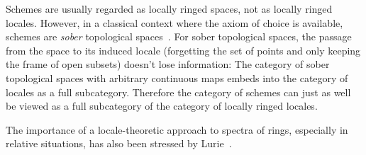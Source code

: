 \documentclass[10pt,reqno,a4paper]{amsbook}
\theoremstyle{definition}
\theoremstyle{plain}
\theoremstyle{remark}
\newcommand{\?}{\,{:}\,}
\renewcommand{\_}{\mathpunct{.}\,}
\newcommand{\stacksproject}[1]{\cite[{\href{http://stacks.math.columbia.edu/tag/#1}{Tag~#1}}]{stacks-project}}
\begin{document}
Schemes are usually regarded as locally ringed spaces, not
as locally ringed locales. However, in a classical
context where the axiom of choice is available, schemes are \emph{sober}
topological spaces~\stacksproject{01IS}. For sober topological spaces, the passage from the space to
its induced locale (forgetting the set of points and only keeping the frame of
open subsets) doesn't lose information: The category of sober topological
spaces with arbitrary continuous maps embeds into the category of locales as a
full subcategory. Therefore the category of schemes can just as well be viewed
as a full subcategory of the category of locally ringed locales.

The importance of a locale-theoretic approach to spectra of rings, especially in
relative situations, has also been stressed by Lurie~\cite[p.~37]{lurie:dag5}.
\end{document}
